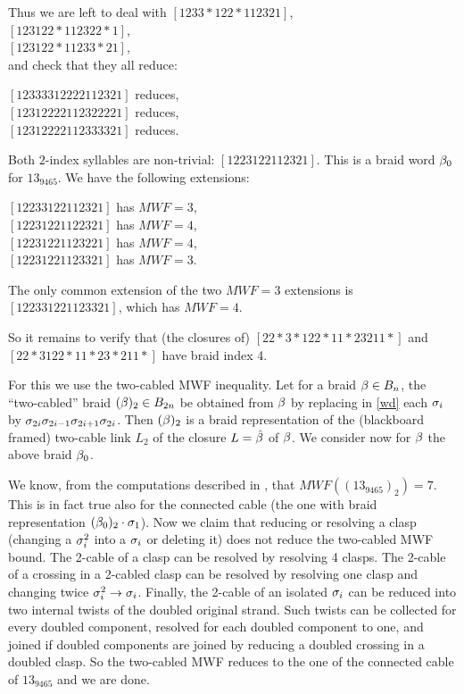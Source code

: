 \begin{caselist}
\begin{caselist}
Thus we are left to deal with
$[1233*122*112321]$,\\
$[123122*112322*1]$,\\
$[123122*11233*21]$,\\
and check that they all reduce:

$[12333312222112321]$ reduces,\\
$[12312222112322221]$ reduces,\\
$[12312222112333321]$ reduces.

\case Both $2$-index syllables are non-trivial:
$[1223122112321]$. This is a braid word $\beta_0$ for $13_{9465}$.
We have the following extensions:

$[12233122112321]$ has $MWF=3$, \\
$[12231221122321]$ has $MWF=4$, \\
$[12231221123221]$ has $MWF=4$, \\
$[12231221123321]$ has $MWF=3$.

The only common extension of the two $MWF=3$ extensions is \\
$[122331221123321]$, which has $MWF=4$.

So it remains to verify that (the closures of)
$[22*3*122*11*23211*]$ and $[22*3122*11*23*211*]$ have braid index 4.


For this we use the two-cabled MWF inequality. Let for a braid
$\beta\in B_n$, the ``two-cabled'' braid $(\beta)_2\in B_{2n}$ be
obtained from $\beta$ by replacing in \eqref{wd} each $\sigma_i$
by $\sigma_{2i}\sigma_{2i-1}\sigma_{2i+1}\sigma_{2i}$. Then $(\beta)_2$
is a braid representation of the (blackboard framed) two-cable
link $L_2$ of the closure $L=\hat{\beta}$ of $\beta$. We consider now
for $\beta$ the above braid $\beta_0$.

We know, from the computations described in \cite{MorSho,WilFr},
that $MWF((13_{9465})_2)=7$. This is in fact true also for the
connected cable (the one with braid representation $(\beta_0)_2
\cdot\sigma_1$). Now we claim that reducing or resolving a clasp
(changing a $\sigma_i^2$ into a $\sigma_i$ or deleting it) does not
reduce the two-cabled MWF bound. The 2-cable of a clasp can be
resolved by resolving 4 clasps. The 2-cable of a crossing in a
2-cabled clasp can be resolved by resolving one clasp and changing
twice $\sigma_i^2\to \sigma_i$. Finally, the 2-cable of an isolated 
$\sigma_i$ can be reduced into two internal twists of the
doubled original strand. Such twists can be collected for
every doubled component, resolved for each doubled component to
one, and joined if doubled components are joined by reducing
a doubled crossing in a doubled clasp. So the two-cabled MWF
reduces to the one of the connected cable of $13_{9465}$ and
we are done.
\end{caselist}
\end{caselist}

